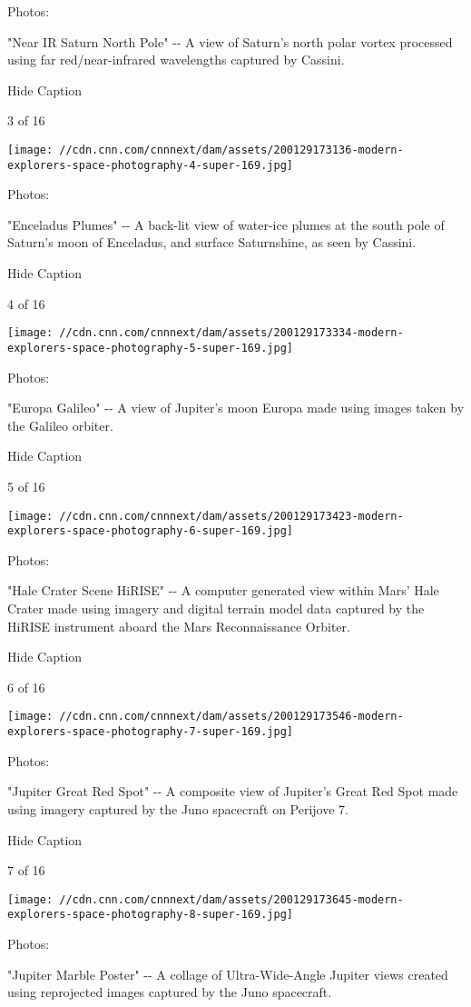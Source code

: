 Photos:

"Near IR Saturn North Pole" -\/- A view of Saturn's north polar vortex
processed using far red/near-infrared wavelengths captured by Cassini.

Hide Caption

3 of 16

\texttt{[image: //cdn.cnn.com/cnnnext/dam/assets/200129173136-modern-explorers-space-photography-4-super-169.jpg]}

Photos:

"Enceladus Plumes" -\/- A back-lit view of water-ice plumes at the south
pole of Saturn's moon of Enceladus, and surface Saturnshine, as seen by
Cassini.

Hide Caption

4 of 16

\texttt{[image: //cdn.cnn.com/cnnnext/dam/assets/200129173334-modern-explorers-space-photography-5-super-169.jpg]}

Photos:

"Europa Galileo" -\/- A view of Jupiter's moon Europa made using images
taken by the Galileo orbiter.

Hide Caption

5 of 16

\texttt{[image: //cdn.cnn.com/cnnnext/dam/assets/200129173423-modern-explorers-space-photography-6-super-169.jpg]}

Photos:

"Hale Crater Scene HiRISE" -\/- A computer generated view within Mars'
Hale Crater made using imagery and digital terrain model data captured
by the HiRISE instrument aboard the Mars Reconnaissance Orbiter.

Hide Caption

6 of 16

\texttt{[image: //cdn.cnn.com/cnnnext/dam/assets/200129173546-modern-explorers-space-photography-7-super-169.jpg]}

Photos:

"Jupiter Great Red Spot" -\/- A composite view of Jupiter's Great Red
Spot made using imagery captured by the Juno spacecraft on Perijove 7.

Hide Caption

7 of 16

\texttt{[image: //cdn.cnn.com/cnnnext/dam/assets/200129173645-modern-explorers-space-photography-8-super-169.jpg]}

Photos:

"Jupiter Marble Poster" -\/- A collage of Ultra-Wide-Angle Jupiter views
created using reprojected images captured by the Juno spacecraft.


